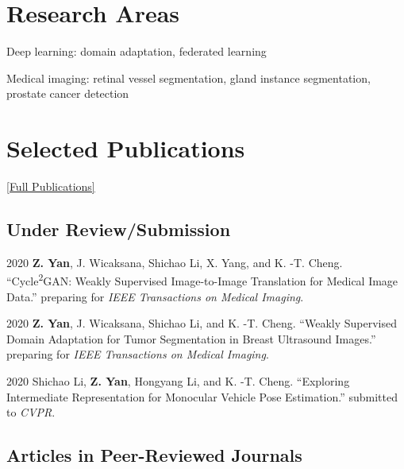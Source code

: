 \documentclass[12pt,letterpaper]{report}
\newcommand{\listitemspace}{0.15em}
\renewenvironment{itemize}
{\begin{list}{}{\setlength{\leftmargin}{0em}
			\setlength{\parskip}{0em}
			\setlength{\itemsep}{\listitemspace}
			\setlength{\parsep}{\listitemspace}}}
	{\end{list}}
\begin{document}
	
	
	\section*{Research Areas}
	
	\begin{itemize}
		
		\item Deep learning: domain adaptation, federated learning
		
		\item Medical imaging: retinal vessel segmentation, gland instance segmentation, prostate cancer detection
		
	\end{itemize}
	
	\section*{Selected Publications}
	
	\href{https://scholar.google.com.hk/citations?hl=zh-CN&user=j0-TqGAAAAAJ&view_op=list_works}{[Full Publications]}
	
	\subsection*{Under Review/Submission}
	
	\begin{tablist}
		
		\item[2020] \tab \textbf{Z. Yan}, J. Wicaksana, Shichao Li, X. Yang, and K. -T. Cheng. \enquote{Cycle\textsuperscript{2}GAN: Weakly Supervised Image-to-Image Translation for Medical Image Data.} preparing for \textit{IEEE Transactions on Medical Imaging}.
		
		\item[2020] \tab \textbf{Z. Yan}, J. Wicaksana, Shichao Li, and K. -T. Cheng. \enquote{Weakly Supervised Domain Adaptation for Tumor Segmentation in Breast Ultrasound Images.} preparing for \textit{IEEE Transactions on Medical Imaging}.
		
		\item[2020] \tab Shichao Li, \textbf{Z. Yan}, Hongyang Li, and K. -T. Cheng. \enquote{Exploring Intermediate Representation for Monocular Vehicle Pose Estimation.} submitted to \textit{CVPR}.
		
	\end{tablist}
		
	\subsection*{Articles in Peer-Reviewed Journals}
	
\end{document}
